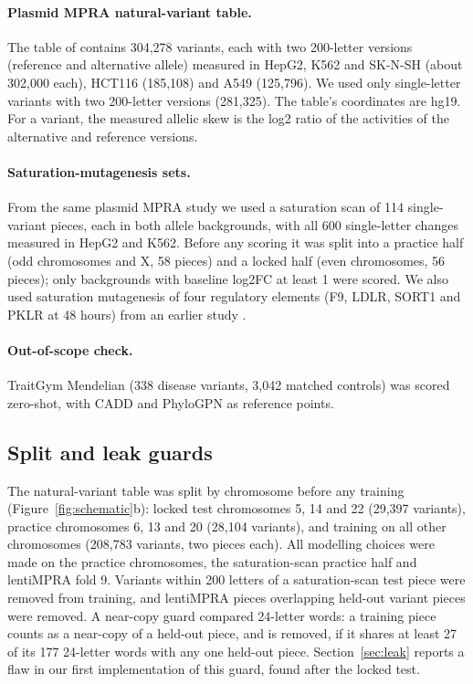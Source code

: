 \documentclass[11pt]{article}
\begin{document}
\paragraph{Plasmid MPRA natural-variant table.} The table of \citet{siraj2026functional} contains 304,278 variants, each with two 200-letter versions (reference and alternative allele) measured in HepG2, K562 and SK-N-SH (about 302,000 each), HCT116 (185,108) and A549 (125,796). We used only single-letter variants with two 200-letter versions (281,325). The table's coordinates are hg19. For a variant, the measured allelic skew is the log2 ratio of the activities of the alternative and reference versions.

\paragraph{Saturation-mutagenesis sets.} From the same plasmid MPRA study we used a saturation scan of 114 single-variant pieces, each in both allele backgrounds, with all 600 single-letter changes measured in HepG2 and K562. Before any scoring it was split into a practice half (odd chromosomes and X, 58 pieces) and a locked half (even chromosomes, 56 pieces); only backgrounds with baseline log2FC at least 1 were scored. We also used saturation mutagenesis of four regulatory elements (F9, LDLR, SORT1 and PKLR at 48 hours) from an earlier study \cite{kircher2019saturation}.

\paragraph{Out-of-scope check.} TraitGym Mendelian \cite{benegas2025benchmarking} (338 disease variants, 3,042 matched controls) was scored zero-shot, with CADD \cite{kircher2014general,rentzsch2018cadd} and PhyloGPN \cite{albors2025phylogenetic} as reference points.

\subsection{Split and leak guards}
\label{sec:split}

The natural-variant table was split by chromosome before any training (Figure~\ref{fig:schematic}b): locked test chromosomes 5, 14 and 22 (29,397 variants), practice chromosomes 6, 13 and 20 (28,104 variants), and training on all other chromosomes (208,783 variants, two pieces each). All modelling choices were made on the practice chromosomes, the saturation-scan practice half and lentiMPRA fold 9. Variants within 200 letters of a saturation-scan test piece were removed from training, and lentiMPRA pieces overlapping held-out variant pieces were removed. A near-copy guard compared 24-letter words: a training piece counts as a near-copy of a held-out piece, and is removed, if it shares at least 27 of its 177 24-letter words with any one held-out piece. Section~\ref{sec:leak} reports a flaw in our first implementation of this guard, found after the locked test.
\end{document}
